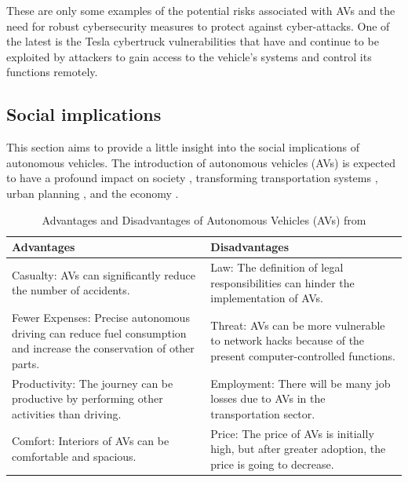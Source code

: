 These are only some examples of the potential risks associated with AVs and the need for robust cybersecurity measures to protect against cyber-attacks.
One of the latest is the Tesla cybertruck vulnerabilities that have and continue to be exploited by attackers to gain access to the vehicle's systems and control its functions remotely.

\subsection{Social implications}\label{subsec:social-implications}

This section aims to provide a little insight into the social implications of autonomous vehicles.
The introduction of autonomous vehicles (AVs) is expected to have a profound impact on society \cite{thomas2020perception}, transforming transportation systems \cite{intelligent_transportation_2023}
, urban planning \cite{impact_autonomous_vehicles_2018}, and the economy \cite{economic_aspects_2020}.

\begin{table}[ht]
    \centering
    \begin{tabular}{|l|l|}
        \hline
        \textbf{Advantages} & \textbf{Disadvantages} \\ \hline
        Casualty: AVs can significantly reduce the number of accidents. & Law: The definition of legal responsibilities can hinder the implementation of AVs. \\ \hline
        Fewer Expenses: Precise autonomous driving can reduce fuel consumption and increase the conservation of other parts. & Threat: AVs can be more vulnerable to network hacks because of the present computer-controlled functions. \\ \hline
        Productivity: The journey can be productive by performing other activities than driving. & Employment: There will be many job losses due to AVs in the transportation sector. \\ \hline
        Comfort: Interiors of AVs can be comfortable and spacious. & Price: The price of AVs is initially high, but after greater adoption, the price is going to decrease. \\ \hline
    \end{tabular}
    \caption{Advantages and Disadvantages of Autonomous Vehicles (AVs) from \cite{ahangar2021survey} }\label{tab:table}
\end{table}

